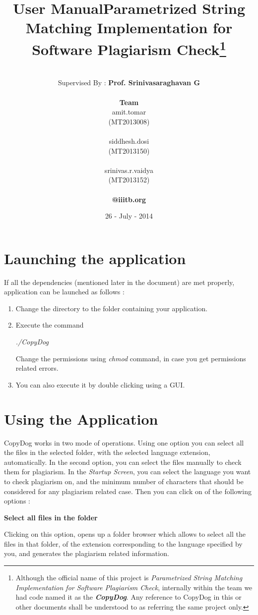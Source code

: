 \documentclass[11pt]{article}
\title{\textbf{User Manual\linebreak Parametrized String Matching Implementation for Software Plagiarism Check}\footnote{Although the official name of this project is \emph{Parametrized String Matching Implementation for Software Plagiarism Check}, internally within the team we had code named it as the \textbf{\emph{CopyDog}}. Any reference to CopyDog in this or other documents shall be understood to as referring the same project only.} }
\author{ 		
        \vspace{ 2 mm}\\
		Supervised By : \textbf{Prof. Srinivasaraghavan G}\\
		\vspace {2mm}\\
		\textbf{Team} \\	
		amit.tomar \\
		(MT2013008) \\
		\vspace{ -1 mm}\\		
		siddhesh.dosi\\								     
		(MT2013150) \\		
		\vspace{ -1 mm}\\					
		srinivas.r.vaidya\\
		(MT2013152) \\
		\vspace{ -2 mm}\\		
		\textbf{@iiitb.org}}
\date{26 - July - 2014 \vspace {35 mm}}
\begin{document}
\maketitle

\vspace {85 mm}

\section{Launching the application}

If all the dependencies (mentioned later in the document) are met properly, application can be launched as follows :

\begin{enumerate}

\item Change the directory to the folder containing your application.

 \item Execute the command
 
\emph{ ./CopyDog }

Change the permissions using \emph{chmod} command, in case you get permissions related errors.
 	
\item You can also execute it by double clicking using a GUI.

\end{enumerate}

\section{Using the Application}

CopyDog works in two mode of operations. Using one option you can select all the files in the selected folder, with the selected language extension, automatically. In the second option, you can select the files manually to check them for plagiarism. In the \emph{Startup Screen}, you can select the language you want to check plagiarism on, and the minimum number of characters that should be considered for any plagiarism related case. Then you can click on of the following options :

\vspace{ 3 mm} 

\noindent \textbf{Select all files in the folder}

\vspace{ 3 mm} 

\noindent Clicking on this option, opens up a folder browser which allows to select all the files in that folder, of the extension corresponding to the language specified by you, and generates the plagiarism related information.
\end{document}
